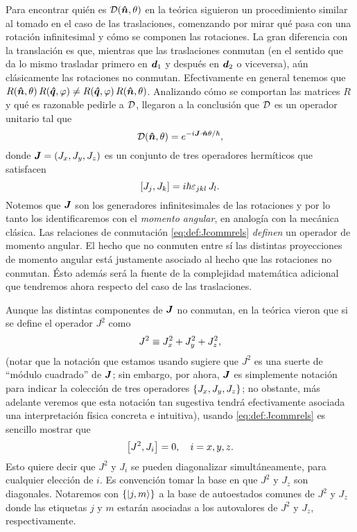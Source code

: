 \documentclass[10pt, a4paper]{article}
\numberwithin{equation}{subsection}
\begin{document}
\bigbreak

Para encontrar quién es $\RotationOp(\vers{n}, \theta)$ en la teórica siguieron
un procedimiento similar al tomado en el caso de las traslaciones, comenzando
por mirar qué pasa con una rotación infinitesimal y cómo se componen las
rotaciones. La gran diferencia con la translación es que, mientras que las
traslaciones conmutan (en el sentido que da lo mismo trasladar primero en
$\vb*{d}_1$ y después en $\vb*{d}_2$ o viceversa), aún clásicamente las
rotaciones no conmutan. Efectivamente en general tenemos que $R(\vu*{n},
\theta)\,R(\vu*{q}, \varphi) \neq R(\vu*{q}, \varphi)\,R(\vu*{n}, \theta)$.
Analizando cómo se comportan las matrices $R$ y qué es razonable pedirle a
$\RotationOp$, llegaron a la conclusión que $\RotationOp$ es un operador
unitario tal que
\begin{equation} \label{eq:def:rotop}
  \RotationOp(\vers{n}, \theta) = e^{-i\vect{J}\cdot\vers{n}\theta/\hbar},
\end{equation}
donde $\vb*{J} = (J_x, J_y, J_z)$ es un conjunto de tres operadores hermíticos
que satisfacen
\begin{equation} \label{eq:def:Jcommrels}
  \comm{J_j}{J_k} = i\hbar\lchivita_{jkl}\,J_l.
\end{equation}
Notemos que $\vb*{J}$ son los generadores infinitesimales de las rotaciones y
por lo tanto los identificaremos con el \emph{momento angular}, en analogía con
la mecánica clásica.
Las relaciones de conmutación \eqref{eq:def:Jcommrels} \emph{definen} un
operador de momento angular. El hecho que no conmuten entre sí las distintas
proyecciones de momento angular está justamente asociado al hecho que las
rotaciones no conmutan. Ésto además será la fuente de la complejidad matemática
adicional que tendremos ahora respecto del caso de las traslaciones.

Aunque las distintas componentes de $\vb*{J}$ no conmutan, en la teórica
vieron que si se define el operador $J^2$ como
\begin{equation} \label{eq:def:J2}
  J^2 \equiv J_x^2 + J_y^2 + J_z^2,
\end{equation}
(notar que la notación que estamos usando sugiere que $J^2$ es una suerte de
``módulo cuadrado'' de $\vb*{J}$; sin embargo, por ahora, $\vb*{J}$ es
simplemente notación para indicar la colección de tres operadores $\set{J_x,
J_y, J_z}$; no obstante, más adelante veremos que esta notación tan sugestiva
tendrá efectivamente asociada una interpretación física concreta e intuitiva),
usando \eqref{eq:def:Jcommrels} es sencillo mostrar que
\begin{equation} \label{eq:prop:J2Jicommrels}
  \comm{J^2}{J_i} = 0, \quad i = x,y,z.
\end{equation}
Esto quiere decir que $J^2$ y $J_i$ se pueden diagonalizar simultáneamente,
para cualquier elección de $i$. Es convención tomar la base en que $J^2$ y
$J_z$ son diagonales. Notaremos con $\set{\ket{j,m}}$ a la base de autoestados
comunes de $J^2$ y $J_z$ donde las etiquetas $j$ y $m$ estarán asociadas a los
autovalores de $J^2$ y $J_z$, respectivamente.
\end{document}
